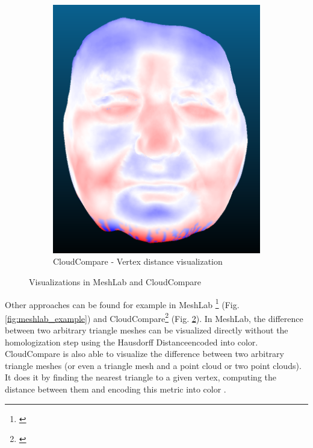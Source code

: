 \begin{figure}[h]
\begin{subfigure}{0.3\textwidth}
	\includegraphics[width=\textwidth]{./img/cloudcompare-example01.PNG}
    \caption[CloudCompare - Vertex distance visualization]{CloudCompare - Vertex distance visualization}
    \label{fig:cloudcompare_example}
	\end{subfigure}
\caption{Visualizations in MeshLab and CloudCompare}
\end{figure}

Other approaches can be found for example in MeshLab \footnote{\citet{MeshLab}} (Fig. \ref{fig:meshlab_example}) and CloudCompare\footnote{\citet{CloudCmp}} (Fig. \ref{fig:cloudcompare_example}). In MeshLab, the difference between two arbitrary triangle meshes can be visualized directly without the homologization step using the Hausdorff Distance\footnotemark encoded into color. CloudCompare is also able to visualize the difference between two arbitrary triangle meshes (or even a triangle mesh and a point cloud or two point clouds). It does it by finding the nearest triangle to a given vertex, computing the distance between them and encoding this metric into color \citep{CloudCmpDistance}.

